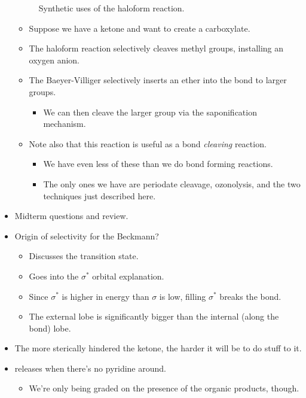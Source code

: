 \documentclass[../notes.tex]{subfiles}
\begin{document}
\begin{itemize}
\begin{figure}[h!]
        \schemestop
        \caption{Synthetic uses of the haloform reaction.}
        \label{fig:haloformSynthetic}
    \end{figure}
    \begin{itemize}
        \item Suppose we have a ketone and want to create a carboxylate.
        \item The haloform reaction selectively cleaves methyl groups, installing an oxygen anion.
        \item The Baeyer-Villiger selectively inserts an ether into the bond to larger groups.
        \begin{itemize}
            \item We can then cleave the larger group via the saponification mechanism.
        \end{itemize}
        \item Note also that this reaction is useful as a  bond \emph{cleaving} reaction.
        \begin{itemize}
            \item We have even less of these than we do  bond forming reactions.
            \item The only ones we have are periodate cleavage, ozonolysis, and the two techniques just described here.
        \end{itemize}
    \end{itemize}
    \item Midterm questions and review.
    \item Origin of selectivity for the Beckmann?
    \begin{itemize}
        \item Discusses the transition state.
        \item Goes into the $\sigma^*$ orbital explanation.
        \item Since $\sigma^*$ is higher in energy than $\sigma$ is low, filling $\sigma^*$ breaks the bond.
        \item The external lobe is significantly bigger than the internal (along the bond) lobe.
    \end{itemize}
    \item The more sterically hindered the ketone, the harder it will be to do stuff to it.
    \item {} releases  when there's no pyridine around.
    \begin{itemize}
        \item We're only being graded on the presence of the organic products, though.

\end{itemize}
\end{itemize}
\end{document}
